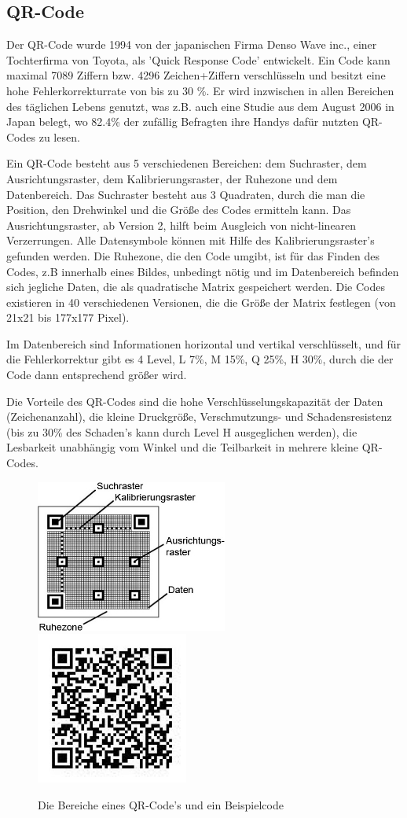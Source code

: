 \subsection*{QR-Code}
Der QR-Code wurde 1994 von der japanischen Firma Denso Wave inc., einer Tochterfirma von Toyota, als 'Quick Response Code' entwickelt. Ein Code kann maximal 7089 Ziffern bzw. 4296 Zeichen+Ziffern verschlüsseln und besitzt eine hohe Fehlerkorrekturrate von bis zu 30 \%. Er wird inzwischen in allen Bereichen des täglichen Lebens genutzt, was z.B. auch eine Studie aus dem August 2006 in Japan belegt, wo 82.4\% der zufällig Befragten ihre Handys dafür nutzten QR-Codes zu lesen.~\cite{Furht2011}

Ein QR-Code besteht aus 5 verschiedenen Bereichen: dem Suchraster, dem Ausrichtungsraster, dem Kalibrierungsraster, der Ruhezone und dem Datenbereich. Das Suchraster besteht aus 3 Quadraten, durch die man die Position, den Drehwinkel und die Größe des Codes ermitteln kann. Das Ausrichtungsraster, ab Version 2, hilft beim Ausgleich von nicht-linearen Verzerrungen. Alle Datensymbole können mit Hilfe des Kalibrierungsraster's gefunden werden. Die Ruhezone, die den Code umgibt, ist für das Finden des Codes, z.B innerhalb eines Bildes, unbedingt nötig und im Datenbereich befinden sich jegliche Daten, die als quadratische Matrix gespeichert werden. Die Codes existieren in 40 verschiedenen Versionen, die die Größe der Matrix festlegen (von 21x21 bis 177x177 Pixel).

Im Datenbereich sind Informationen horizontal und vertikal verschlüsselt, und für die Fehlerkorrektur gibt es 4 Level, L 7\%, M 15\%, Q 25\%, H 30\%, durch die der Code dann entsprechend größer wird.

Die Vorteile des QR-Codes sind die hohe Verschlüsselungskapazität der Daten (Zeichenanzahl), die kleine Druckgröße, Verschmutzungs- und Schadensresistenz (bis zu 30\% des Schaden's kann durch Level H ausgeglichen werden), die Lesbarkeit unabhängig vom Winkel und die Teilbarkeit in mehrere kleine QR-Codes.~\cite{DensoWave2010}

\begin{figure}[H]
  \centering
  \includegraphics[height=5cm]{img/QR/Aufbau_qr-codes.jpg}
  \includegraphics[height=5cm]{img/QR/perfect_03.jpg}
  \caption{Die Bereiche eines QR-Code's und ein Beispielcode}
  \label{fig:qrexample}
\end{figure}
